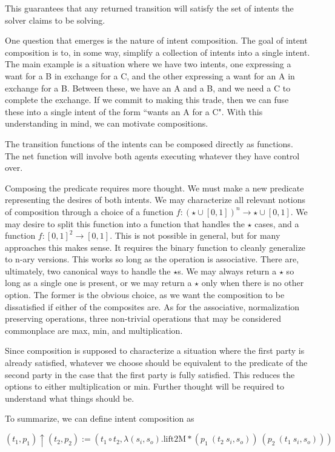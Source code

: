 This guarantees that any returned transition will satisfy the set of intents the solver claims to be solving.

One question that emerges is the nature of intent composition. The goal of intent composition is to, in some way, simplify a collection of intents into a single intent. The main example is a situation where we have two intents, one expressing a want for a B in exchange for a C, and the other expressing a want for an A in exchange for a B. Between these, we have an A and a B, and we need a C to complete the exchange. If we commit to making this trade, then we can fuse these into a single intent of the form ``wants an A for a C". With this understanding in mind, we can motivate compositions.

The transition functions of the intents can be composed directly as functions. The net function will involve both agents executing whatever they have control over.

Composing the predicate requires more thought. We must make a new predicate representing the desires of both intents. We may characterize all relevant notions of composition through a choice of a function $f : (\star \cup [0, 1])^n \rightarrow \star \cup [0, 1]$. We may desire to split this function into a function that handles the $\star$ cases, and a function $f : [0, 1]^2 \rightarrow [0, 1]$. This is not possible in general, but for many approaches this makes sense. It requires the binary function to cleanly generalize to n-ary versions. This works so long as the operation is associative. There are, ultimately, two canonical ways to handle the $\star$s. We may always return a $\star$ so long as a single one is present, or we may return a $\star$ only when there is no other option. The former is the obvious choice, as we want the composition to be dissatisfied if either of the composites are. As for the associative, normalization preserving operations, three non-trivial operations that may be considered commonplace are max, min, and multiplication.

Since composition is supposed to characterize a situation where the first party is already satisfied, whatever we choose should be equivalent to the predicate of the second party in the case that the first party is fully satisfied. This reduces the options to either multiplication or min. Further thought will be required to understand what things should be.

To summarize, we can define intent composition as

\begin{equation}
    (t_1, p_1) \uparrow (t_2, p_2) := (t_1 \circ t_2, \lambda (s_i, s_o). \text{lift2M} * (p_1\ (t_2\ s_i, s_o))\ (p_2\ (t_1\ s_i, s_o)))
\end{equation}

